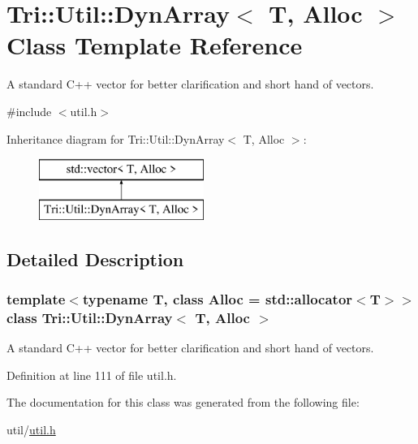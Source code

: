 \hypertarget{class_tri_1_1_util_1_1_dyn_array}{}\section{Tri\+:\+:Util\+:\+:Dyn\+Array$<$ T, Alloc $>$ Class Template Reference}
\label{class_tri_1_1_util_1_1_dyn_array}


A standard C++ vector for better clarification and short hand of vectors.  




{\ttfamily \#include $<$util.\+h$>$}

Inheritance diagram for Tri\+:\+:Util\+:\+:Dyn\+Array$<$ T, Alloc $>$\+:\begin{figure}[H]
\begin{center}
\leavevmode
\includegraphics[height=2.000000cm]{class_tri_1_1_util_1_1_dyn_array}
\end{center}
\end{figure}


\subsection{Detailed Description}
\subsubsection*{template$<$typename T, class Alloc = std\+::allocator$<$\+T$>$$>$class Tri\+::\+Util\+::\+Dyn\+Array$<$ T, Alloc $>$}

A standard C++ vector for better clarification and short hand of vectors. 

Definition at line 111 of file util.\+h.



The documentation for this class was generated from the following file\+:\begin{DoxyCompactItemize}
\item 
util/\hyperlink{util_2util_8h}{util.\+h}\end{DoxyCompactItemize}
